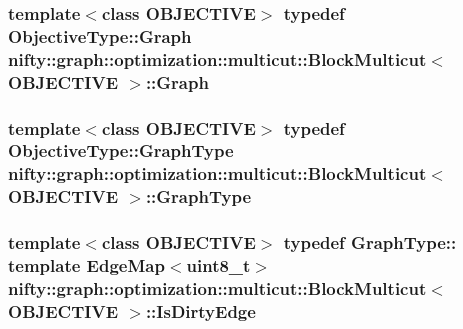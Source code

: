 \subsubsection[{Graph}]{\setlength{\rightskip}{0pt plus 5cm}template$<$class O\+B\+J\+E\+C\+T\+I\+V\+E$>$ typedef Objective\+Type\+::\+Graph {\bf nifty\+::graph\+::optimization\+::multicut\+::\+Block\+Multicut}$<$ O\+B\+J\+E\+C\+T\+I\+V\+E $>$\+::{\bf Graph}}\label{classnifty_1_1graph_1_1optimization_1_1multicut_1_1BlockMulticut_aa10337744cd85afe7cf6ee27d6310e32}
\hypertarget{classnifty_1_1graph_1_1optimization_1_1multicut_1_1BlockMulticut_a1b57836064e7b70edea2f286436e66f4}{}
\subsubsection[{Graph\+Type}]{\setlength{\rightskip}{0pt plus 5cm}template$<$class O\+B\+J\+E\+C\+T\+I\+V\+E$>$ typedef Objective\+Type\+::\+Graph\+Type {\bf nifty\+::graph\+::optimization\+::multicut\+::\+Block\+Multicut}$<$ O\+B\+J\+E\+C\+T\+I\+V\+E $>$\+::{\bf Graph\+Type}}\label{classnifty_1_1graph_1_1optimization_1_1multicut_1_1BlockMulticut_a1b57836064e7b70edea2f286436e66f4}
\hypertarget{classnifty_1_1graph_1_1optimization_1_1multicut_1_1BlockMulticut_a0044d2f41c0eb7867b4a4fd18048158a}{}
\subsubsection[{Is\+Dirty\+Edge}]{\setlength{\rightskip}{0pt plus 5cm}template$<$class O\+B\+J\+E\+C\+T\+I\+V\+E$>$ typedef Graph\+Type\+:: template Edge\+Map$<$uint8\+\_\+t$>$ {\bf nifty\+::graph\+::optimization\+::multicut\+::\+Block\+Multicut}$<$ O\+B\+J\+E\+C\+T\+I\+V\+E $>$\+::{\bf Is\+Dirty\+Edge}}\label{classnifty_1_1graph_1_1optimization_1_1multicut_1_1BlockMulticut_a0044d2f41c0eb7867b4a4fd18048158a}
\hypertarget{classnifty_1_1graph_1_1optimization_1_1multicut_1_1BlockMulticut_a568ee0171f58ef95b5b32a4d15aaf2f5}{}
